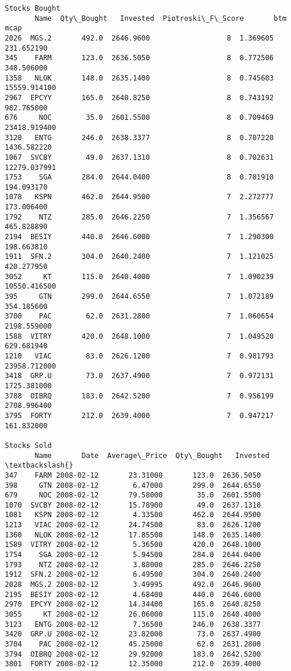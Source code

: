 \documentclass[11pt]{article}
\begin{document}
\begin{Verbatim}[commandchars=\\\{\}]
Stocks Bought
       Name  Qty\_Bought   Invested  Piotroski\_F\_Score       btm          mcap
2026  MGS.2       492.0  2646.9600                  8  1.369605    231.652190
345    FARM       123.0  2636.5050                  8  0.772506    348.506000
1358   NLOK       148.0  2635.1400                  8  0.745603  15559.914100
2967  EPCYY       165.0  2640.8250                  8  0.743192    982.765000
676     NOC        35.0  2601.5500                  8  0.709469  23418.919400
3120   ENTG       246.0  2638.3377                  8  0.707220   1436.582220
1067  SVCBY        49.0  2637.1310                  8  0.702631  12279.037991
1753    SGA       284.0  2644.0400                  8  0.701910    194.093170
1078   KSPN       462.0  2644.9500                  7  2.272777    173.006400
1792    NTZ       285.0  2646.2250                  7  1.356567    465.828890
2194  BESIY       440.0  2646.6000                  7  1.290300    198.663810
1911  SFN.2       304.0  2640.2400                  7  1.121025    420.277950
3052     KT       115.0  2640.4000                  7  1.090239  10550.416500
395     GTN       299.0  2644.6550                  7  1.072189    354.185600
3700    PAC        62.0  2631.2800                  7  1.060654   2198.559000
1588  VITRY       420.0  2648.1000                  7  1.049520    629.681940
1210   VIAC        83.0  2626.1200                  7  0.981793  23958.712000
3418  GRP.U        73.0  2637.4900                  7  0.972131   1725.381000
3788  OIBRQ       183.0  2642.5200                  7  0.956199   2708.996400
3795  FORTY       212.0  2639.4000                  7  0.947217    161.832000

Stocks Sold
       Name       Date  Average\_Price  Qty\_Bought   Invested  \textbackslash{}
347    FARM 2008-02-12       23.31000       123.0  2636.5050
398     GTN 2008-02-12        6.47000       299.0  2644.6550
679     NOC 2008-02-12       79.58000        35.0  2601.5500
1070  SVCBY 2008-02-12       15.78900        49.0  2637.1310
1081   KSPN 2008-02-12        4.33500       462.0  2644.9500
1213   VIAC 2008-02-12       24.74500        83.0  2626.1200
1360   NLOK 2008-02-12       17.85500       148.0  2635.1400
1589  VITRY 2008-02-12        5.36500       420.0  2648.1000
1754    SGA 2008-02-12        5.94500       284.0  2644.0400
1793    NTZ 2008-02-12        3.88000       285.0  2646.2250
1912  SFN.2 2008-02-12        6.49500       304.0  2640.2400
2028  MGS.2 2008-02-12        3.49995       492.0  2646.9600
2195  BESIY 2008-02-12        4.68400       440.0  2646.6000
2970  EPCYY 2008-02-12       14.34400       165.0  2640.8250
3055     KT 2008-02-12       26.06000       115.0  2640.4000
3123   ENTG 2008-02-12        7.36500       246.0  2638.3377
3420  GRP.U 2008-02-12       23.82000        73.0  2637.4900
3704    PAC 2008-02-12       45.25000        62.0  2631.2800
3794  OIBRQ 2008-02-12       29.92000       183.0  2642.5200
3801  FORTY 2008-02-12       12.35000       212.0  2639.4000


\end{Verbatim}
\end{document}

